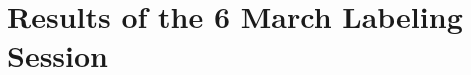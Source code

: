 
\def\mytitle{Chapter 3}
\usepackage{xcolor}

\def\bibliocommand{}
\chapter{Results of the 6 March Labeling Session}
\label{resultsofthe6marchlabelingsession}






